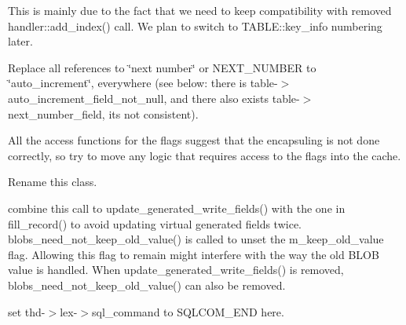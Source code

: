 
\begin{DoxyRefList}
\item[\label{todo__todo000024}%
\Hypertarget{todo__todo000024}%
Member \mbox{\hyperlink{classAlter__inplace__info_a1774915f106804ab1aeb6629d58bcae4}{Alter\+\_\+inplace\+\_\+info\+:\+:key\+\_\+info\+\_\+buffer}} ]This is mainly due to the fact that we need to keep compatibility with removed handler\+::add\+\_\+index() call. We plan to switch to T\+A\+B\+L\+E\+::key\+\_\+info numbering later. 
\item[\label{todo__todo000021}%
\Hypertarget{todo__todo000021}%
Member \mbox{\hyperlink{handler_8cc_a24d44ee426ff4454b3e832c4470d6cc7}{A\+U\+T\+O\+\_\+\+I\+N\+C\+\_\+\+D\+E\+F\+A\+U\+L\+T\+\_\+\+N\+B\+\_\+\+R\+O\+WS}} ]Replace all references to \char`\"{}next number\char`\"{} or N\+E\+X\+T\+\_\+\+N\+U\+M\+B\+ER to \char`\"{}auto\+\_\+increment\char`\"{}, everywhere (see below\+: there is table-\/$>$auto\+\_\+increment\+\_\+field\+\_\+not\+\_\+null, and there also exists table-\/$>$next\+\_\+number\+\_\+field, it\textquotesingle{}s not consistent). 
\item[\label{todo__todo000003}%
\Hypertarget{todo__todo000003}%
Class \mbox{\hyperlink{classbinlog__cache__data}{binlog\+\_\+cache\+\_\+data}} ]All the access functions for the flags suggest that the encapsuling is not done correctly, so try to move any logic that requires access to the flags into the cache.  
\item[\label{todo__todo000078}%
\Hypertarget{todo__todo000078}%
Class \mbox{\hyperlink{classCOPY__INFO}{C\+O\+P\+Y\+\_\+\+I\+N\+FO}} ]Rename this class. 
\item[\label{todo__todo000077}%
\Hypertarget{todo__todo000077}%
Member \mbox{\hyperlink{classCOPY__INFO_a7ce8622f7a089c3b7ad02858539899ba}{C\+O\+P\+Y\+\_\+\+I\+N\+FO\+:\+:set\+\_\+function\+\_\+defaults}} (\mbox{\hyperlink{structTABLE}{T\+A\+B\+LE}} $\ast$table)]combine this call to update\+\_\+generated\+\_\+write\+\_\+fields() with the one in fill\+\_\+record() to avoid updating virtual generated fields twice. blobs\+\_\+need\+\_\+not\+\_\+keep\+\_\+old\+\_\+value() is called to unset the m\+\_\+keep\+\_\+old\+\_\+value flag. Allowing this flag to remain might interfere with the way the old B\+L\+OB value is handled. When update\+\_\+generated\+\_\+write\+\_\+fields() is removed, blobs\+\_\+need\+\_\+not\+\_\+keep\+\_\+old\+\_\+value() can also be removed.  
\item[\label{todo__todo000100}%
\Hypertarget{todo__todo000100}%
Member \mbox{\hyperlink{group__Runtime__Environment_gabf07206792036bfb47e5bb8eb0f20bc4}{dispatch\+\_\+command}} (T\+HD $\ast$thd, const C\+O\+M\+\_\+\+D\+A\+TA $\ast$com\+\_\+data, enum enum\+\_\+server\+\_\+command command)]set thd-\/$>$lex-\/$>$sql\+\_\+command to S\+Q\+L\+C\+O\+M\+\_\+\+E\+ND here. 


\end{DoxyRefList}
